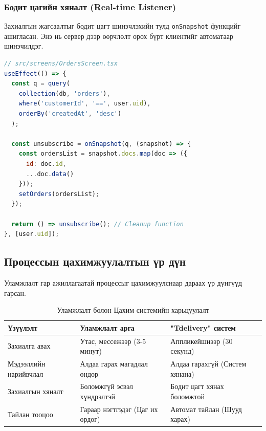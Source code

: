 \subsubsection{Бодит цагийн хяналт (Real-time Listener)}
Захиалгын жагсаалтыг бодит цагт шинэчлэхийн тулд \texttt{onSnapshot} функцийг ашигласан. Энэ нь сервер дээр өөрчлөлт орох бүрт клиентийг автоматаар шинэчилдэг.

\begin{lstlisting}[language=JavaScript, caption=Бодит цагийн захиалгын жагсаалт]
// src/screens/OrdersScreen.tsx
useEffect(() => {
  const q = query(
    collection(db, 'orders'),
    where('customerId', '==', user.uid),
    orderBy('createdAt', 'desc')
  );

  const unsubscribe = onSnapshot(q, (snapshot) => {
    const ordersList = snapshot.docs.map(doc => ({
      id: doc.id,
      ...doc.data()
    }));
    setOrders(ordersList);
  });

  return () => unsubscribe(); // Cleanup function
}, [user.uid]);
\end{lstlisting}

\subsection{Процессын цахимжуулалтын үр дүн}
Уламжлалт гар ажиллагаатай процессыг цахимжуулснаар дараах үр дүнгүүд гарсан.

\begin{table}[h]
\centering
\caption{Уламжлалт болон Цахим системийн харьцуулалт}
\begin{tabular}{|p{4cm}|p{5cm}|p{5cm}|}
\hline
\textbf{Үзүүлэлт} & \textbf{Уламжлалт арга} & \textbf{"Tdelivery" систем} \\
\hline
Захиалга авах & Утас, мессежээр (3-5 минут) & Аппликейшнээр (30 секунд) \\
\hline
Мэдээллийн нарийвчлал & Алдаа гарах магадлал өндөр & Алдаа гарахгүй (Систем хянана) \\
\hline
Захиалгын хяналт & Боломжгүй эсвэл хүндрэлтэй & Бодит цагт хянах боломжтой \\
\hline
Тайлан тооцоо & Гараар нэгтгэдэг (Цаг их ордог) & Автомат тайлан (Шууд харах) \\
\hline
\end{tabular}
\end{table}


